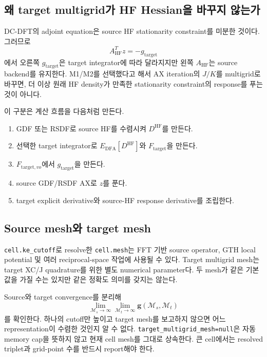 \subsection{왜 target multigrid가 HF Hessian을 바꾸지 않는가}

DC-DFT의 adjoint equation은 source HF stationarity constraint를 미분한 것이다.
그러므로
\begin{equation}
  A_{\mathrm{HF}}^Tz=-g_{\mathrm{target}}
\end{equation}
에서 오른쪽 $g_{\mathrm{target}}$은 target integrator에 따라 달라지지만 왼쪽
$A_{\mathrm{HF}}$는 source backend를 유지한다. M1/M2를 선택했다고 해서 AX iteration의
$J/K$를 multigrid로 바꾸면, 더 이상 원래 HF density가 만족한 stationarity constraint의
response를 푸는 것이 아니다.

이 구분은 계산 흐름을 다음처럼 만든다.
\begin{enumerate}
  \item GDF 또는 RSDF로 source HF를 수렴시켜 $D^{\mathrm{HF}}$를 만든다.
  \item 선택한 target integrator로 $E_{\mathrm{DFA}}[D^{\mathrm{HF}}]$와
        $F_{\mathrm{target}}$을 만든다.
  \item $F_{\mathrm{target},vo}$에서 $g_{\mathrm{target}}$을 만든다.
  \item source GDF/RSDF AX로 $z$를 푼다.
  \item target explicit derivative와 source-HF response derivative를 조립한다.
\end{enumerate}

\subsection{Source mesh와 target mesh}

\texttt{cell.ke\_cutoff}로 resolve한 \texttt{cell.mesh}는 FFT 기반 source operator,
GTH local potential 및 여러 reciprocal-space 작업에 사용될 수 있다. Target multigrid
mesh는 target XC/J quadrature를 위한 별도 numerical parameter다. 두 mesh가 같은
기본값을 가질 수는 있지만 같은 정확도 의미를 갖지는 않는다.

Source와 target convergence를 분리해
\begin{equation}
  \lim_{\mathcal M_s\to\infty}
  \lim_{\mathcal M_t\to\infty}
  \mathbf g(\mathcal M_s,\mathcal M_t)
  \label{eq:target-grid-convergence}
\end{equation}
를 확인한다. 하나의 cutoff만 높이고 target mesh를 보고하지 않으면 어느
representation이 수렴한 것인지 알 수 없다. \texttt{target\_multigrid\_mesh=null}은
자동 memory cap을 뜻하지 않고 현재 cell mesh를 그대로 상속한다. 큰 cell에서는 resolved
triplet과 grid-point 수를 반드시 report해야 한다.

